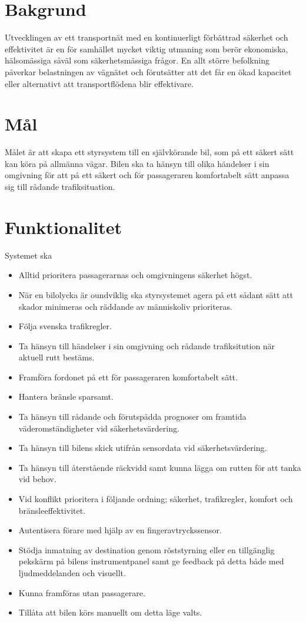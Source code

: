 \documentclass[10pt]{article}
\begin{document}
\section{Bakgrund}
\sloppy
\noindent Utvecklingen av ett transportnät med en kontinuerligt förbättrad säkerhet och effektivitet är en för samhället mycket viktig utmaning som berör ekonomiska, hälsomässiga såväl som säkerhetsmässiga frågor. En allt större befolkning påverkar belastningen av vägnätet och förutsätter att det får en ökad kapacitet eller alternativt att transportflödena blir effektivare.

\section{Mål}
\sloppy
\noindent Målet är att skapa ett styrsystem till en självkörande bil, som på ett säkert sätt kan köra på allmänna vägar. Bilen ska ta hänsyn till olika händelser i sin omgivning för att på ett säkert och för passageraren komfortabelt sätt anpassa sig till rådande trafiksituation. 

\section{Funktionalitet}
\sloppy
\noindent Systemet ska
\begin{itemize}
	\setlength\itemsep{0.1em}
	\item Alltid prioritera passagerarnas och omgivningens säkerhet högst.
	\item När en bilolycka är oundviklig ska styrsystemet agera på ett sådant sätt att skador minimeras och räddande av människoliv prioriteras.
	\item Följa svenska trafikregler.
	\item Ta hänsyn till händelser i sin omgivning och rådande trafiksitution  när aktuell rutt bestäms.
	\item Framföra fordonet på ett för passageraren komfortabelt sätt.
	\item Hantera bränsle sparsamt.
	\item Ta hänsyn till rådande och förutspådda prognoser om framtida väderomständigheter vid säkerhetsvärdering.
	\item Ta hänsyn till bilens skick utifrån sensordata vid säkerhetsvärdering.
	\item Ta hänsyn till återstående räckvidd samt kunna lägga om rutten för att tanka vid behov.
	\item Vid konflikt prioritera i följande ordning; säkerhet, trafikregler, komfort och bränsleeffektivitet.
	\item Autentisera förare med hjälp av en fingeravtryckssensor.
	\item Stödja inmatning av destination genom röststyrning eller en tillgänglig pekskärm på bilens instrumentpanel samt ge feedback på detta både med ljudmeddelanden och visuellt.
	\item Kunna framföras utan passagerare.
	\item Tillåta att bilen körs manuellt om detta läge valts.
\end{itemize}
\end{document}
